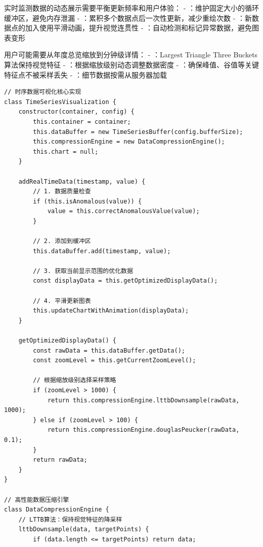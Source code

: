 
实时监测数据的动态展示需要平衡更新频率和用户体验： - ：维护固定大小的循环缓冲区，避免内存泄漏 - ：累积多个数据点后一次性更新，减少重绘次数 - ：新数据点的加入使用平滑动画，提升视觉连贯性 - ：自动检测和标记异常数据，避免图表变形


用户可能需要从年度总览缩放到分钟级详情： - ：Largest Triangle Three Buckets算法保持视觉特征 - ：根据缩放级别动态调整数据密度 - ：确保峰值、谷值等关键特征点不被采样丢失 - ：细节数据按需从服务器加载

\begin{lstlisting}[style=javascript]
// 时序数据可视化核心实现
class TimeSeriesVisualization {
    constructor(container, config) {
        this.container = container;
        this.dataBuffer = new TimeSeriesBuffer(config.bufferSize);
        this.compressionEngine = new DataCompressionEngine();
        this.chart = null;
    }
    
    addRealTimeData(timestamp, value) {
        // 1. 数据质量检查
        if (this.isAnomalous(value)) {
            value = this.correctAnomalousValue(value);
        }
        
        // 2. 添加到缓冲区
        this.dataBuffer.add(timestamp, value);
        
        // 3. 获取当前显示范围的优化数据
        const displayData = this.getOptimizedDisplayData();
        
        // 4. 平滑更新图表
        this.updateChartWithAnimation(displayData);
    }
    
    getOptimizedDisplayData() {
        const rawData = this.dataBuffer.getData();
        const zoomLevel = this.getCurrentZoomLevel();
        
        // 根据缩放级别选择采样策略
        if (zoomLevel > 1000) {
            return this.compressionEngine.lttbDownsample(rawData, 1000);
        } else if (zoomLevel > 100) {
            return this.compressionEngine.douglasPeucker(rawData, 0.1);
        }
        return rawData;
    }
}

// 高性能数据压缩引擎
class DataCompressionEngine {
    // LTTB算法：保持视觉特征的降采样
    lttbDownsample(data, targetPoints) {
        if (data.length <= targetPoints) return data;
        

\end{lstlisting}
